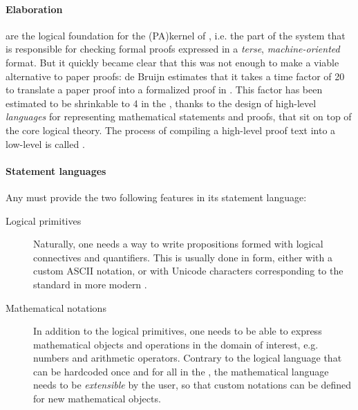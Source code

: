 \paragraph{Elaboration}

\AP
{} are the logical foundation for the \intro(PA){kernel} of
, i.e. the part of the system that is responsible for
checking formal proofs expressed in a \emph{terse}, \emph{machine-oriented}
format. But it quickly became clear that this was not enough to make  a viable alternative to paper proofs: de Bruijn estimates that it
takes a time factor of 20 to translate a paper proof into a formalized proof in
 . This factor has been
estimated to be shrinkable to 4 in the  
, thanks to the design of high-level \emph{languages}
for representing mathematical statements and proofs, that sit on top of the core
logical theory. The process of compiling a high-level proof text into a low-level
 is called .

\paragraph{Statement languages}

Any  must provide the two following features in its statement
language:

\begin{description}
  \item[Logical primitives] Naturally, one needs a way to write
  propositions formed with logical connectives and quantifiers. This is usually
  done in  form, either with a custom ASCII notation, or with
  Unicode characters corresponding to the standard  in more modern
  . 
  \item[Mathematical notations] In addition to the logical primitives,
  one needs to be able to express mathematical objects and operations in the
  domain of interest, e.g. numbers and arithmetic operators. Contrary to the
  logical language that can be hardcoded once and for all in the , the mathematical language needs to be \emph{extensible} by the
  user, so that custom notations can be defined for new mathematical objects.
\end{description}

